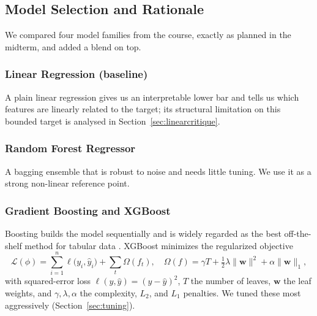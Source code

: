 \documentclass[journal]{IEEEtran}
\begin{document}
\subsection{Model Selection and Rationale}
We compared four model families from the course, exactly as planned in the
midterm, and added a blend on top.

\subsubsection{Linear Regression (baseline)}
A plain linear regression gives us an interpretable lower bar and tells us which
features are linearly related to the target; its structural limitation on this
bounded target is analysed in Section~\ref{sec:linearcritique}.

\subsubsection{Random Forest Regressor}
A bagging ensemble \cite{breiman1996,breiman2001} that is robust to noise and
needs little tuning. We use it as a strong non-linear reference point.

\subsubsection{Gradient Boosting and XGBoost}
Boosting builds the model sequentially and is widely regarded as the best
off-the-shelf method for tabular data \cite{friedman2001,chen2016xgboost}.
XGBoost minimizes the regularized objective
\begin{equation}
\mathcal{L}(\phi)=\sum_{i=1}^{n}\ell\!\big(y_i,\hat y_i\big)
+\sum_{t}\Omega(f_t),\quad
\Omega(f)=\gamma T+\tfrac{1}{2}\lambda\lVert\mathbf{w}\rVert^{2}
+\alpha\lVert\mathbf{w}\rVert_{1},
\label{eq:xgbobj}
\end{equation}
with squared-error loss $\ell(y,\hat y)=(y-\hat y)^2$, $T$ the number of leaves,
$\mathbf{w}$ the leaf weights, and $\gamma,\lambda,\alpha$ the complexity,
$L_2$, and $L_1$ penalties. We tuned these most aggressively
(Section~\ref{sec:tuning}).
\end{document}
